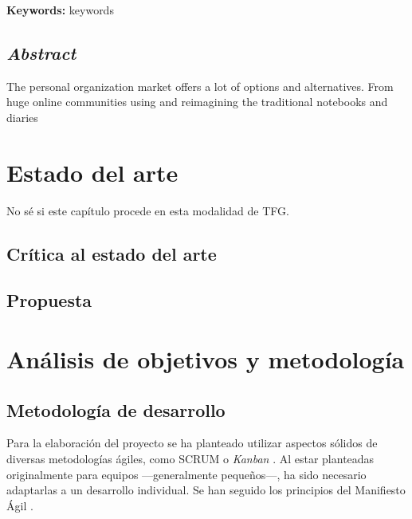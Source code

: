 \documentclass[10pt, a4paper]{aqademic}
\begin{document}
\newpage


\textbf{Keywords:} keywords


\section{\textit{Abstract}}

The personal organization market offers a lot of options and alternatives. From huge online communities using and reimagining the traditional notebooks and diaries


\chapter{Estado del arte}

No sé si este capítulo procede en esta modalidad de TFG.

\section{Crítica al estado del arte}

\section{Propuesta}


\chapter{Análisis de objetivos y metodología}

\section{Metodología de desarrollo}

Para la elaboración del proyecto se ha planteado utilizar aspectos sólidos de diversas metodologías ágiles, como SCRUM \cite{schwaber2017scrum} o \textit{Kanban} \cite{kanban}. Al estar planteadas originalmente para equipos ---generalmente pequeños---, ha sido necesario adaptarlas a un desarrollo individual. Se han seguido los principios del Manifiesto Ágil \cite{beck2001agile}.

\medskip



\medskip
\end{document}
